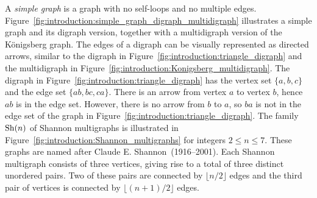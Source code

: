 A \emph{simple graph} is a graph with no self-loops and no multiple
edges. Figure~\ref{fig:introduction:simple_graph_digraph_multidigraph}
illustrates a simple graph and its digraph version, together with a
multidigraph version of the K\"onigsberg graph. The edges of a digraph
can be visually represented as directed arrows, similar to the digraph
in
Figure~\ref{fig:introduction:triangle_digraph} and the multidigraph in
Figure~\ref{fig:introduction:Konigsberg_multidigraph}. The digraph in
Figure~\ref{fig:introduction:triangle_digraph} has the vertex set
$\{a, b, c\}$ and the edge set $\{ab, bc, ca\}$. There is an arrow
from vertex $a$ to vertex $b$, hence $ab$ is in the edge set. However,
there is no arrow from $b$ to $a$, so $ba$ is not in the edge set of
the graph in Figure~\ref{fig:introduction:triangle_digraph}. The
family $\operatorname*{Sh}(n)$ of Shannon multigraphs is illustrated in
Figure~\ref{fig:introduction:Shannon_multigraphs} for integers
$2 \leq n \leq 7$. These graphs are named after Claude
E. Shannon~(1916--2001). Each Shannon multigraph consists of three
vertices, giving rise to a total of three distinct unordered
pairs. Two of these pairs are connected by $\lfloor n/2 \rfloor$
edges and the third pair of vertices is connected by
$\lfloor (n + 1) / 2 \rfloor$ edges.

